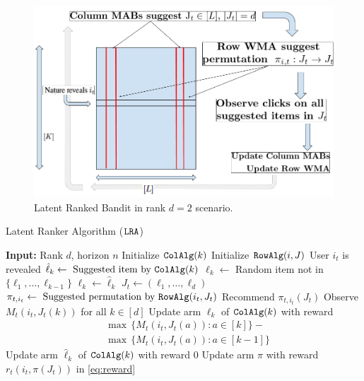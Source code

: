 \begin{figure}
    \includegraphics[scale=0.2]{img/RankedBand.png}
    \caption{Latent Ranked Bandit in rank $d=2$ scenario. }
    \label{fig:rankedbandit}
    \vspace*{-1em}
\end{figure}

\begin{algorithm}[t]
  \caption{Latent Ranker Algorithm (${\tt LRA}$)}
  \label{alg:latent ranker}
  \begin{algorithmic}[1]
    \State \textbf{Input:} Rank $d$, horizon $n$
    \State
      \State Initialize ${\tt ColAlg}(k)$
    \EndFor
      \State Initialize ${\tt RowAlg}(i, J)$
    \EndFor
    \State
      \State User $i_t$ is revealed
        \State $\hat{\ell}_k \gets \text{ Suggested item by } {\tt ColAlg}(k)$
          \State $\ell_k \gets$ Random item not in $\{\ell_1, \dots, \ell_{k - 1}\}$
        \Else
          \State $\ell_k \gets \hat{\ell}_k$
        \EndIf
      \EndFor
      \State $J_t \gets (\ell_1, \dots, \ell_d)$
      \State $\pi_{t, i_t} \gets \text{ Suggested permutation by } {\tt RowAlg}(i_t, J_t)$
      \State
      \State Recommend $\pi_{t, i_t}(J_t)$
      \State Observe $M_t(i_t, J_t(k))$ for all $k \in [d]$
      \State
        \State Update arm $\ell_k$ of ${\tt ColAlg}(k)$ with reward
        \begin{align*}
          & \max \, \{M_t(i_t, J_t(a)): a \in [k]\} - {} \\
          & \max \, \{M_t(i_t, J_t(a)): a \in [k - 1]\}
        \end{align*}
          \State Update arm $\hat{\ell}_k$ of ${\tt ColAlg}(k)$ with reward $0$
        \EndIf
      \EndFor
        \State Update arm $\pi$ with reward $r_t(i_t, \pi(J_t))$ in \eqref{eq:reward}
      \EndFor
    \EndFor
  \end{algorithmic}
\end{algorithm}
